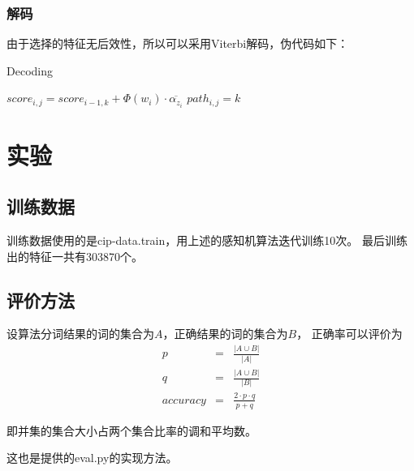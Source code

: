 \documentclass[11pt, a4paper]{article}
\begin{document}
\begin{CJK*}{UTF8}{gbsn}
				\subsubsection{解码}
					由于选择的特征无后效性，所以可以采用Viterbi解码，伪代码如下：
					\begin{algorithm}
						\caption{Decoding}               %
						\label{alg2}                         %
						\begin{algorithmic}
											\STATE $score_{i,j} = score_{i-1,k} + \Phi(w_i) \cdot \overline{\alpha_{z_i}}$
											\STATE $path_{i,j} = k$
										\ENDIF
									\ENDFOR
								\ENDFOR
							\ENDFOR
						\end{algorithmic}
					\end{algorithm}	
		\section{实验}
			\subsection{训练数据}
				训练数据使用的是cip-data.train，用上述的感知机算法迭代训练10次。
				最后训练出的特征一共有303870个。
			\subsection{评价方法}
				设算法分词结果的词的集合为$A$，正确结果的词的集合为$B$，
				正确率可以评价为
				\begin{eqnarray*}
					p &=& \frac{|A\cup B|}{|A|}\\q &= &\frac{|A\cup B|}{|B|}\\
					accuracy &=& \frac{2\cdot p\cdot q}{p + q}
				\end{eqnarray*}
				
				即并集的集合大小占两个集合比率的调和平均数。
				
				这也是提供的eval.py的实现方法。

\end{CJK*}
\end{document}
